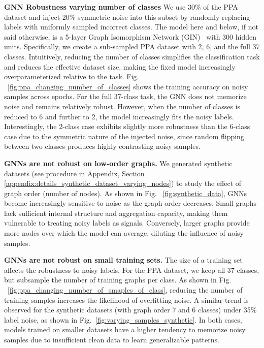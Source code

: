 \textbf{GNN Robustness varying number of classes }
We use 30\% of the PPA dataset and inject 20\% symmetric noise into this subset by randomly replacing labels with uniformly sampled incorrect classes. The model here and below, if not said otherwise, is a 5-layer Graph Isomorphism Network (GIN)~\citet{WL1} with 300 hidden units.
Specifically, we create a sub-sampled PPA dataset with 2, 6, and the full 37 classes. Intuitively, reducing the number of classes simplifies the classification task and reduces the effective dataset size, making the fixed model increasingly overparameterized relative to the task.
Fig. ~\ref{fig:ppa_changing_number_of_classes} shows the training accuracy on noisy samples across epochs. For the full 37-class task, the GNN does not memorize noise and remains relatively robust. However, when the number of classes is reduced to 6 and further to 2, the model increasingly fits the noisy labels. Interestingly, the 2-class case exhibits slightly more robustness than the 6-class case due to the symmetric nature of the injected noise, since random flipping between two classes produces highly contrasting noisy samples.

\textbf{GNNs are not robust on low-order graphs.}  
We generated synthetic datasets (see procedure in Appendix, Section \ref{appendix:details_synthetic_dataset_varying_nodes}) to study the effect of graph order (number of nodes). As shown in Fig. ~\ref{fig:synthetic_data}, GNNs become increasingly sensitive to noise as the graph order decreases. Small graphs lack sufficient internal structure and aggregation capacity, making them vulnerable to treating noisy labels as signals. Conversely, larger graphs provide more nodes over which the model can average, diluting the influence of noisy samples.


\textbf{GNNs are not robust on small training sets.}  
The size of a training set affects the robustness to noisy labels. For the PPA dataset, we keep all 37 classes, but subsample the number of training graphs per class. As shown in Fig. ~\ref{fig:ppa_changing_number_of_smaples_of_class}, reducing the number of training samples increases the likelihood of overfitting noise. A similar trend is observed for the synthetic datasets (with graph order 7 and 6 classes) under 35\% label noise, as shown in Fig.~\ref {fig:varying_samples_synthetic}. In both cases, models trained on smaller datasets have a higher tendency to memorize noisy samples due to insufficient clean data to learn generalizable patterns.








